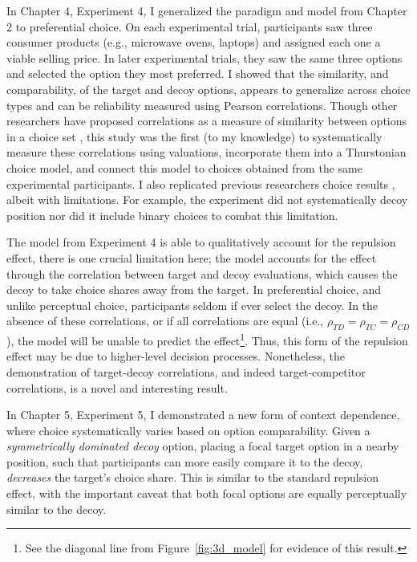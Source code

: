 In Chapter 4, Experiment 4, I generalized the paradigm and model from Chapter 2 to preferential choice. On each experimental trial, participants saw three consumer products (e.g., microwave ovens, laptops) and assigned each one a viable selling price. In later experimental trials, they saw the same three options and selected the option they most preferred. I showed that the similarity, and comparability, of the target and decoy options, appears to generalize across choice types and can be reliability measured using Pearson correlations. Though other researchers have proposed correlations as a measure of similarity between options in a choice set \parencite{kamakura1984predicting,natenzon2019random}, this study was the first (to my knowledge) to systematically measure these correlations using valuations, incorporate them into a Thurstonian choice model, and connect this model to choices obtained from the same experimental participants. I also replicated previous researchers choice results \parencite{banerjeeFactorsThatPromote2024}, albeit with limitations. For example, the experiment did not systematically decoy position nor did it include binary choices to combat this limitation. 

The model from Experiment 4 is able to qualitatively account for the repulsion effect, there is one crucial limitation here; the model accounts for the effect through the correlation between target and decoy evaluations, which causes the decoy to take choice shares away from the target. In preferential choice, and unlike perceptual choice, participants seldom if ever select the decoy. In the absence of these correlations, or if all correlations are equal (i.e., $\rho_{TD}=\rho_{TC}=\rho_{CD}$), the model will be unable to predict the effect\footnote{See the diagonal line from Figure~\ref{fig:3d_model} for evidence of this result.}. Thus, this form of the repulsion effect may be due to higher-level decision processes. Nonetheless, the demonstration of target-decoy correlations, and indeed target-competitor correlations, is a novel and interesting result. 

In Chapter 5, Experiment 5, I demonstrated a new form of context dependence, where choice systematically varies based on option comparability. Given a \textit{symmetrically dominated decoy} option, placing a focal target option in a nearby position, such that participants can more easily compare it to the decoy, \textit{decreases} the target's choice share. This is similar to the standard repulsion effect, with the important caveat that both focal options are equally perceptually similar to the decoy. 

